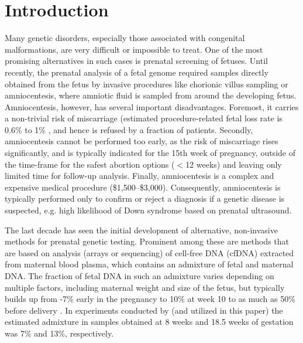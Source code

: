 \section{Introduction}

Many genetic disorders, especially those associated with congenital malformations, are very difficult or impossible to treat. One of the most promising alternatives in such cases is prenatal screening of fetuses. 
Until recently, the prenatal analysis of a fetal genome required samples directly obtained from the fetus by invasive procedures like chorionic villus sampling or amniocentesis, where amniotic fluid is sampled from around the developing fetus.
Amniocentesis, however, has several important disadvantages. Foremost, it carries a non-trivial risk of miscarriage (estimated procedure-related fetal loss rate is 0.6\% to 1\% \citep{douglas2007amnio}, and hence is refused by a fraction of patients. Secondly, amniocentesis cannot be performed too early, as the risk of miscarriage rises significantly, and is typically indicated for the 15th week of pregnancy, outside of the time-frame for the safest abortion options ($<$12 weeks) and leaving only limited time for follow-up analysis. Finally, amniocentesis is a complex and expensive medical procedure (\$1,500--\$3,000). Consequently, amniocentesis is typically performed only to confirm or reject a diagnosis if a genetic disease is suspected, e.g. high likelihood of Down syndrome based on prenatal ultrasound. 

The last decade has seen the initial development of alternative, non-invasive methods for prenatal genetic testing. Prominent among these are methods that are based on analysis (arrays or sequencing) of  cell-free DNA (cfDNA) extracted from maternal blood plasma, which contains an admixture of fetal and maternal DNA. The fraction of fetal DNA in such an admixture varies depending on multiple factors, including maternal weight and size of the fetus, but typically builds up from -7\% early in the pregnancy to 10\% at week 10 \citep{wang2013} to as much as 50\% before delivery \citep{wang2013, fan2012}. In experiments conducted by \cite{kitzman2012} (and utilized in this paper) the estimated admixture in samples obtained at 8 weeks and 18.5 weeks of gestation was 7\% and 13\%, respectively. 

